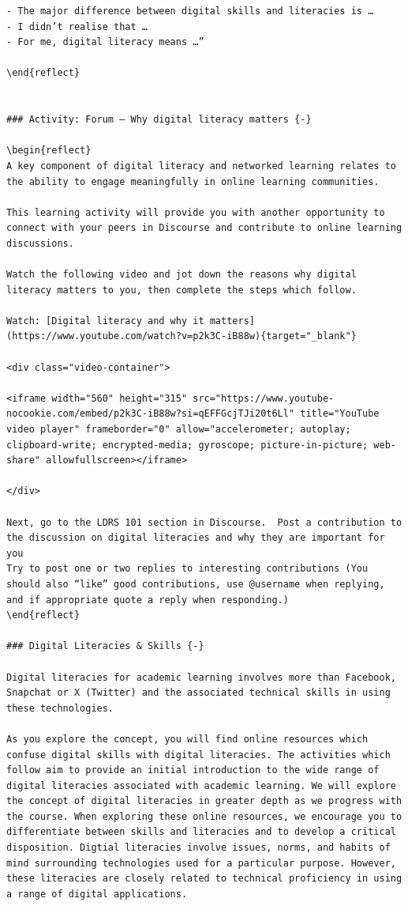 \documentclass[
]{book}
\theoremstyle{definition}
\theoremstyle{definition}
\theoremstyle{definition}
\theoremstyle{definition}
\theoremstyle{remark}
\begin{document}
\begin{verbatim}
- The major difference between digital skills and literacies is …
- I didn’t realise that …
- For me, digital literacy means …”

\end{reflect}


### Activity: Forum – Why digital literacy matters {-}

\begin{reflect}
A key component of digital literacy and networked learning relates to the ability to engage meaningfully in online learning communities.

This learning activity will provide you with another opportunity to connect with your peers in Discourse and contribute to online learning discussions.

Watch the following video and jot down the reasons why digital literacy matters to you, then complete the steps which follow.

Watch: [Digital literacy and why it matters](https://www.youtube.com/watch?v=p2k3C-iB88w){target="_blank"}

<div class="video-container">

<iframe width="560" height="315" src="https://www.youtube-nocookie.com/embed/p2k3C-iB88w?si=qEFFGcjTJi20t6Ll" title="YouTube video player" frameborder="0" allow="accelerometer; autoplay; clipboard-write; encrypted-media; gyroscope; picture-in-picture; web-share" allowfullscreen></iframe>

</div>

Next, go to the LDRS 101 section in Discourse.  Post a contribution to the discussion on digital literacies and why they are important for you  
Try to post one or two replies to interesting contributions (You should also “like” good contributions, use @username when replying, and if appropriate quote a reply when responding.)  
\end{reflect}

### Digital Literacies & Skills {-}

Digital literacies for academic learning involves more than Facebook, Snapchat or X (Twitter) and the associated technical skills in using these technologies. 

As you explore the concept, you will find online resources which confuse digital skills with digital literacies. The activities which follow aim to provide an initial introduction to the wide range of digital literacies associated with academic learning. We will explore the concept of digital literacies in greater depth as we progress with the course. When exploring these online resources, we encourage you to differentiate between skills and literacies and to develop a critical disposition. Digtial literacies involve issues, norms, and habits of mind surrounding technologies used for a particular purpose. However, these literacies are closely related to technical proficiency in using a range of digital applications.  


\end{verbatim}
\end{document}
